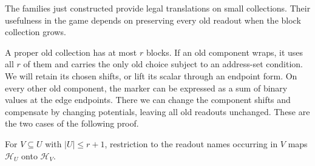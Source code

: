 The families just constructed provide legal translations on small
collections. Their usefulness in the game depends on preserving every
old readout when the block collection grows.

A proper old collection has at most $r$ blocks. If an old component
wraps, it uses all $r$ of them and carries the only old choice subject to
an address-set condition. We will retain its chosen shifts, or lift its
scalar through an endpoint form. On every other old component,
the marker can be expressed as a sum of binary values at the edge
endpoints. There we can change the component shifts and compensate by
changing potentials, leaving all old
readouts unchanged. These are the two cases of the following proof.

\begin{proposition}
\label{prop:exact-projection}
For $V\subseteq U$ with $|U|\leq r+1$, restriction to the readout names
occurring in $V$ maps $\mathcal H_U$ onto $\mathcal H_V$.
\end{proposition}


